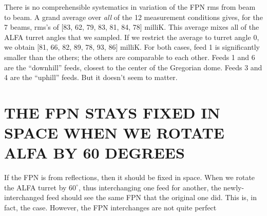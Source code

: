 \documentclass[psfig,preprint]{aastex}
\begin{document}
	There is no comprehensible systematics in variation of the FPN
rms from beam to beam.  A grand average over {\it all} of the 12
measurement conditions gives, for the 7 beams, rms's of [83, 62, 79, 83,
81, 84, 78] milliK.  This average mixes all of the ALFA turret angles
that we sampled.  If we restrict the average to turret angle 0, we
obtain [81, 66, 82, 89, 78, 93, 86] milliK.  For both cases, feed 1 is
significantly smaller than the others; the others are comparable to each
other.  Feeds 1 and 6 are the ``downhill'' feeds, closest to the center
of the Gregorian dome.  Feeds 3 and 4 are the ``uphill'' feeds.  But it
doesn't seem to matter. 

\section{THE FPN STAYS FIXED IN SPACE WHEN WE ROTATE ALFA BY 60 DEGREES}
\label{interchange}

	If the FPN is from reflections, then it should be fixed in
space.  When we rotate the ALFA turret by $60^\circ$, thus interchanging
one feed for another, the newly-interchanged feed should see the same
FPN that the original one did.  This is, in fact, the case.  However,
the FPN interchanges are not quite perfect
\end{document}
